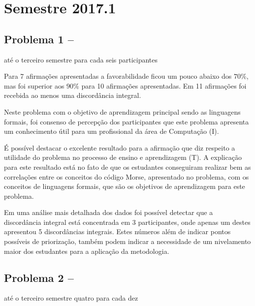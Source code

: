 \section{Semestre 2017.1}
\label{sec-sem-2017}

\subsection{Problema 1 -- \ProblemaG}
\label{sec-2017-p1}
{até o terceiro semestre}{ para cada seis participantes}

Para 7 afirmações apresentadas a favorabilidade ficou um pouco abaixo dos $70\%$, mas
foi superior aos $90\%$ para 10 afirmações apresentadas.
Em 11 afirmações foi recebida ao menos uma discordância integral.

Neste problema com o objetivo de aprendizagem principal sendo
as linguagens formais, foi consenso de percepção dos participantes que
este problema apresenta um conhecimento útil para um profissional
da área de Computação (I).

É possível destacar o excelente resultado para a afirmação que diz respeito a
utilidade do problema no processo de ensino e aprendizagem (T).
A explicação para este resultado está no fato de que os estudantes
conseguiram realizar bem as correlações entre os conceitos
do código Morse, apresentado no problema, com os conceitos de
linguagens formais, que são os objetivos de aprendizagem para
este problema.

Em uma análise mais detalhada dos dados foi possível
detectar que a discordância integral está concentrada
em 3 participantes, onde apenas um destes apresentou
5 discordâncias integrais.
Estes números além de indicar pontos possíveis de
priorização, também podem indicar a necessidade
de um nivelamento maior dos estudantes para a aplicação
da metodologia.


\subsection{Problema 2 -- \ProblemaB}
{até o terceiro semestre}{ quatro para cada dez}

